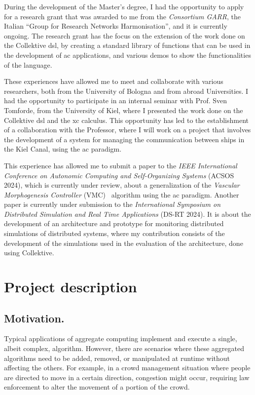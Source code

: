 \documentclass[12pt, a4paper]{article}
\begin{document}
During the development of the Master's degree,
I had the opportunity to apply for a research grant that was awarded to me from the \emph{Consortium GARR},
the Italian ``Group for Research Networks Harmonisation'',
and it is currently ongoing.
%
The research grant has the focus on the extension of the work done on the Collektive \ac{dsl},
by creating a standard library of functions that can be used in the development of \ac{ac} applications,
and various demos to show the functionalities of the language.

These experiences have allowed me to meet and collaborate with various researchers,
both from the University of Bologna and from abroad Universities.
%
I had the opportunity to participate in an internal seminar with Prof. Sven Tomforde,
from the University of Kiel,
where I presented the work done on the Collektive \ac{dsl} and the \ac{xc} calculus.
%
This opportunity has led to the establishment of a collaboration with the Professor,
where I will work on a project that involves the development of a system for managing the communication between ships in the Kiel Canal,
using the \ac{ac} paradigm.

This experience has allowed me to submit a paper to the \emph{IEEE International Conference on Autonomic Computing and Self-Organizing Systems} (ACSOS 2024),
which is currently under review,
about a generalization of the \emph{Vascular Morphogenesis Controller} (VMC)~\cite{ZahadatHS17} algorithm using the \ac{ac} paradigm.
%
Another paper is currently under submission to the \emph{International Symposium on Distributed Simulation and Real Time Applications} (DS-RT 2024).
%
It is about the development of an architecture and prototype
for monitoring distributed simulations of distributed systems,
where my contribution consists of the development of the simulations used in the evaluation of the architecture,
done using Collektive.

\section{Project description}
\label{sec:project-description}

\subsection{Motivation.}
\label{subsec:motivation.}

Typical applications of aggregate computing implement and execute a single, albeit complex, algorithm.
%
However,
there are scenarios where these aggregated algorithms need to be added, removed,
or manipulated at runtime without affecting the others.
%
For example,
in a crowd management situation where people are directed to move in a certain direction,
congestion might occur,
requiring law enforcement to alter the movement of a portion of the crowd.
\end{document}
